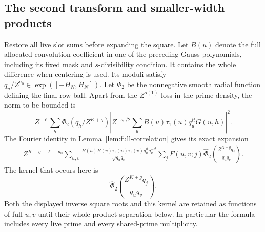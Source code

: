 \documentclass[11pt,a4paper]{article}
\numberwithin{equation}{section}
\numberwithin{figure}{section}
\theoremstyle{definition}
\theoremstyle{remark}
\begin{document}
\subsection{The second transform and smaller-width products}\label{sec:plain-second-transform}

Restore all live slot sums before expanding the square.  Let
\(B(u)\) denote the full allocated convolution coefficient in
one of the preceding Gauss polynomials, including its fixed mask
and \(s\)-divisibility condition.  It contains the whole difference
when centering is used.  Its moduli satisfy
\(q_u/Z^{a_0}\in\exp([-H_N,H_N])\).  Let \(\Phi_2\) be the nonnegative
smooth radial function defining the final row ball.  Apart from
the \(Z^{o(1)}\) loss in the prime density, the norm to be bounded is
\[
 Z^{-\ell}\sum_h\Phi_2(q_h/Z^{K+g})
 \left|Z^{-a_0/2}\sum_u B(u)\tau_1(u)q_u^{it}G(u,h)\right|^2.
\]
The Fourier identity in Lemma~\ref{lem:full-correlation} gives its
exact expansion
\[
 \begin{split}
 Z^{K+g-\ell-a_0}\sum_{u,v}
 \frac{B(u)\overline{B(v)}\tau_1(u)\overline{\tau_1(v)}
       q_u^{it}q_v^{-it}}{\sqrt{q_uq_v}}
 \sum_j F(u,v;j)
 \widehat\Phi_2\left(\frac{Z^{K+g}q_j}{q_uq_v}\right).
 \end{split}
\]
The kernel that occurs here is
\begin{equation}
 \widehat\Phi_2\left(\frac{Z^{K+g}q_j}{q_uq_v}\right).
 \label{old-eq:2.18b}
\end{equation}
Both the displayed inverse square roots and this kernel are retained
as functions of full \(u,v\) until their whole-product separation below.  In particular the
formula includes every live prime and every shared-prime multiplicity.
\end{document}
